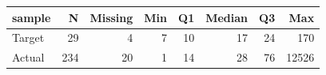 \begin{table}[ht]
\centering
\begin{tabular}{lrrrrrrr}
 sample & N & Missing & Min & Q1 & Median & Q3 & Max \\ 
  \hline
Target & 29 & 4 & 7 & 10 & 17 & 24 & 170 \\ 
  Actual & 234 & 20 & 1 & 14 & 28 & 76 & 12526 \\ 
  \end{tabular}
\end{table}
